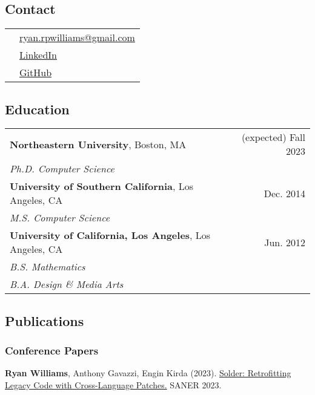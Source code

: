 \documentclass[11pt]{article}
\begin{document}

\subsection{Contact}
\label{sec:contact}

\begin{tabularx}{\textwidth}{ll}
    & \href{mailto:ryan.rpwilliams@gmail.com}{ryan.rpwilliams@gmail.com} \\
    & \href{https://www.linkedin.com/in/ryan-paul-williams}{LinkedIn} \\
    & \href{https://github.com/williamsryan}{GitHub} \\
\end{tabularx}

\subsection{Education}
\label{sec:education}

\begin{tabularx}{\textwidth}{>{\raggedright\arraybackslash}p{8cm}>{\raggedright\arraybackslash}r}
    \textbf{Northeastern University}, Boston, MA & (expected) Fall 2023 \\
    \textit{Ph.D. Computer Science} & \\
    \textbf{University of Southern California}, Los Angeles, CA & Dec. 2014 \\
    \textit{M.S. Computer Science} & \\
    \textbf{University of California, Los Angeles}, Los Angeles, CA & Jun. 2012 \\
    \textit{B.S. Mathematics} & \\
    \textit{B.A. Design \& Media Arts} & \\
\end{tabularx}

\subsection{Publications}
\label{sec:publications}
\subsubsection{Conference Papers}
\textbf{Ryan Williams}, Anthony Gavazzi, Engin Kirda (2023).
\href{https://ieeexplore.ieee.org/abstract/document/10123487}{Solder: Retrofitting Legacy Code with Cross-Language Patches.}
SANER 2023.
\end{document}
